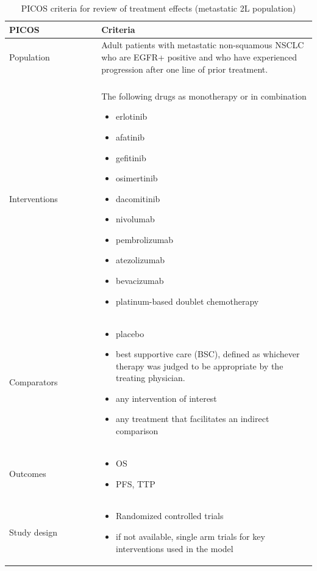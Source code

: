 \documentclass[11pt,final,fleqn]{article}\usepackage[]{graphicx}\usepackage[]{color}
\theoremstyle{plain}
\begin{document}
\begin{appendices}
\begin{table}[!ht]
\begin{center}
\begin{threeparttable}
\caption{PICOS criteria for review of treatment effects (metastatic 2L population)} \label{tbl:picos-tx-effects-2L}
\begin{tabular}{p{0.3\linewidth}p{0.7\linewidth}}
\hline
\multicolumn{1}{l}{PICOS} &  \multicolumn{1}{l}{Criteria}\\
\hline
Population & Adult patients with metastatic non-squamous NSCLC who are EGFR+ positive and
who have experienced progression after one line of prior treatment.\\
&\\
Interventions & The following drugs as monotherapy or in combination 
\begin{itemize}
\item erlotinib
\item afatinib
\item gefitinib
\item osimertinib
\item dacomitinib
\item nivolumab
\item pembrolizumab
\item atezolizumab
\item bevacizumab
\item platinum-based doublet chemotherapy
\end{itemize} \\
Comparators & 
\begin{itemize}
\item placebo
\item best supportive care (BSC), defined as whichever therapy was judged to be appropriate by the treating physician.
\item any intervention of interest
\item any treatment that facilitates an indirect comparison
\end{itemize} \\
Outcomes & 
\begin{itemize}
\item OS
\item PFS, TTP
\end{itemize} \\
Study design &
\begin{itemize}
\item Randomized controlled trials
\item if not available, single arm trials for key interventions used in the model

\end{itemize}
\end{tabular}
\end{threeparttable}
\end{center}
\end{table}
\end{appendices}
\end{document}
